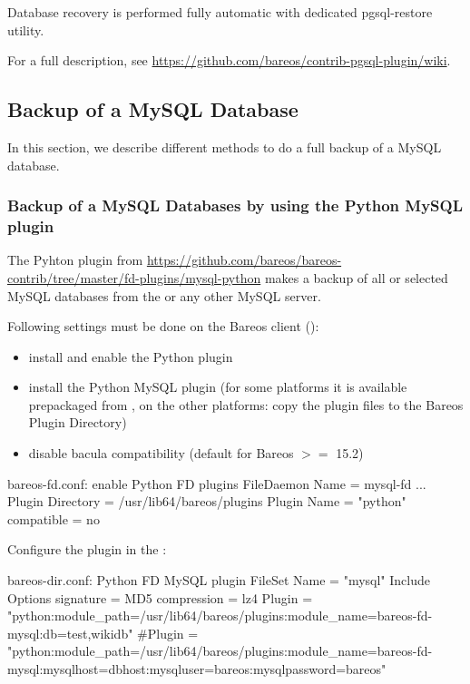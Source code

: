 Database recovery is performed fully automatic with dedicated pgsql-restore utility.

For a full description, see \url{https://github.com/bareos/contrib-pgsql-plugin/wiki}.



\subsection{Backup of a MySQL Database}
\label{backup-mysql}

In this section, we describe different methods to do a full backup of a MySQL database.

\subsubsection{Backup of a MySQL Databases by using the Python MySQL plugin}
\label{backup-mysql-python}

The Pyhton plugin from \url{https://github.com/bareos/bareos-contrib/tree/master/fd-plugins/mysql-python} makes a backup of all or selected 
MySQL databases from the \bareosFd or any other MySQL server.

Following settings must be done on the Bareos client (\bareosFd):
\begin{itemize}
  \item install and enable the \bareosFd Python plugin
  \item install the Python MySQL plugin (for some platforms it is available prepackaged from \contribDownloadBareosOrg, on the other platforms: copy the plugin files to the Bareos Plugin Directory)
  \item disable bacula compatibility (default for Bareos $>=$ 15.2)
\end{itemize}

\begin{bconfig}{bareos-fd.conf: enable Python FD plugins}
FileDaemon {
  Name = mysql-fd
  ...
  Plugin Directory = /usr/lib64/bareos/plugins
  Plugin Name = "python"
  compatible = no
}
\end{bconfig}

Configure the plugin in the \bareosDir:

\begin{bconfig}{bareos-dir.conf: Python FD MySQL plugin}
FileSet {
    Name = "mysql"
    Include {
      Options {
        signature = MD5
        compression = lz4
      }
      Plugin = "python:module_path=/usr/lib64/bareos/plugins:module_name=bareos-fd-mysql:db=test,wikidb"
      #Plugin = "python:module_path=/usr/lib64/bareos/plugins:module_name=bareos-fd-mysql:mysqlhost=dbhost:mysqluser=bareos:mysqlpassword=bareos"
    }
}
\end{bconfig}

